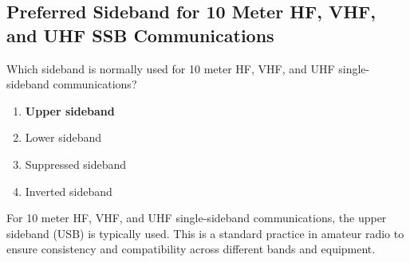 \subsection{Preferred Sideband for 10 Meter HF, VHF, and UHF SSB Communications}
\label{T8A06}

\begin{tcolorbox}[colback=gray!10!white,colframe=black!75!black,title=T8A06]
Which sideband is normally used for 10 meter HF, VHF, and UHF single-sideband communications?
\begin{enumerate}[noitemsep]
    \item \textbf{Upper sideband}
    \item Lower sideband
    \item Suppressed sideband
    \item Inverted sideband
\end{enumerate}
\end{tcolorbox}

For 10 meter HF, VHF, and UHF single-sideband communications, the upper sideband (USB) is typically used. This is a standard practice in amateur radio to ensure consistency and compatibility across different bands and equipment.